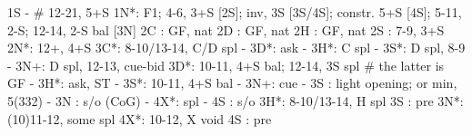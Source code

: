 1S -  # 12-21, 5+S
1N*: F1; 4-6, 3+S [2S]; inv, 3S [3S/4S]; constr. 5+S [4S]; 5-11, 2-S; 12-14, 2-S bal [3N]
2C : GF, nat
2D : GF, nat
2H : GF, nat
2S : 7-9, 3+S
2N*: 12+, 4+S
3C*: 8-10/13-14, C/D spl
   - 3D*: ask
        - 3H*: C spl
        - 3S*: D spl, 8-9
        - 3N+: D spl, 12-13, cue-bid
3D*: 10-11, 4+S bal; 12-14, 3S spl  # the latter is GF
   - 3H*: ask, ST
        - 3S*: 10-11, 4+S bal
        - 3N+: cue
   - 3S : light opening; or min, 5(332)
   - 3N : s/o (CoG)
   - 4X*: spl
   - 4S : s/o
3H*: 8-10/13-14, H spl
3S : pre
3N*: (10)11-12, some spl
4X*: 10-12, X void
4S : pre